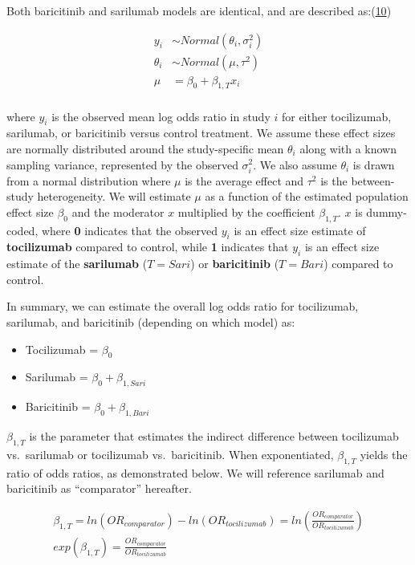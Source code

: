 \documentclass[
  12pt,
]{article}
\providecommand{\tightlist}{%
  \setlength{\itemsep}{0pt}\setlength{\parskip}{0pt}}
\begin{document}
Both baricitinib and sarilumab models are identical, and are described
as:(\protect\hyperlink{ref-pitchforth2012}{10})

\begin{align*}
y_i & \sim Normal(\theta_i, \sigma_i^2)\\
\theta_i & \sim Normal(\mu, \tau^2)\\
\mu &= \beta_0 + \beta_{1, T} x_i\\
\end{align*}

where \(y_i\) is the observed mean log odds ratio in study \(i\) for
either tocilizumab, sarilumab, or baricitinib versus control treatment.
We assume these effect sizes are normally distributed around the
study-specific mean \(\theta_i\) along with a known sampling variance,
represented by the observed \(\sigma_i^2\). We also assume \(\theta_i\)
is drawn from a normal distribution where \(\mu\) is the average effect
and \(\tau^2\) is the between-study heterogeneity. We will estimate
\(\mu\) as a function of the estimated population effect size
\(\beta_0\) and the moderator \(x\) multiplied by the coefficient
\(\beta_{1, T}\). \(x\) is dummy-coded, where \textbf{0} indicates that
the observed \(y_i\) is an effect size estimate of \textbf{tocilizumab}
compared to control, while \textbf{1} indicates that \(y_i\) is an
effect size estimate of the \textbf{sarilumab} (\(T = Sari\)) or
\textbf{baricitinib} (\(T = Bari\)) compared to control.

In summary, we can estimate the overall log odds ratio for tocilizumab,
sarilumab, and baricitinib (depending on which model) as:

\begin{itemize}
\tightlist
\item
  Tocilizumab = \(\beta_0\)
\item
  Sarilumab = \(\beta_0 + \beta_{1, Sari}\)
\item
  Baricitinib = \(\beta_0 + \beta_{1, Bari}\)
\end{itemize}

\(\beta_{1, T}\) is the parameter that estimates the indirect difference
between tocilizumab vs.~sarilumab or tocilizumab vs.~baricitinib. When
exponentiated, \(\beta_{1, T}\) yields the ratio of odds ratios, as
demonstrated below. We will reference sarilumab and baricitinib as
``comparator'' hereafter.

\begin{gather*}
\beta_{1, T}  = ln(OR_{comparator}) - ln(OR_{tocilizumab}) = ln(\frac{OR_{comparator}}{OR_{tocilizumab}})\\
exp(\beta_{1, T})  = \frac {OR_{comparator}}{OR_{tocilizumab}}
\end{gather*}
\end{document}

